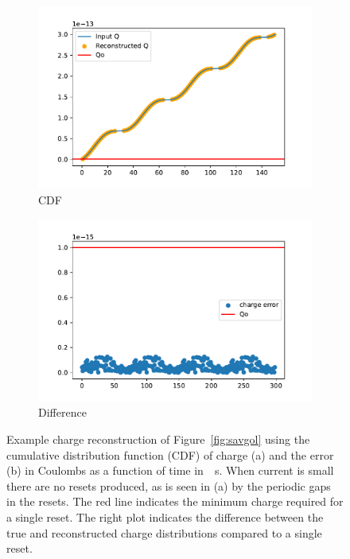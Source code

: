 \begin{figure}[]
\centering
\begin{subfigure}{.5\textwidth}
  \centering
  \includegraphics[width=\textwidth]{images/reconQ.pdf}
  \caption{CDF}
\end{subfigure}%
\begin{subfigure}{.5\textwidth}
  \centering
  \includegraphics[width=\textwidth]{images/diffQ.pdf}
  \caption{Difference}
\end{subfigure}
\caption{Example charge reconstruction of Figure~\ref{fig:savgol} using the cumulative distribution function (CDF) of charge (a) and the error (b) in Coulombs as a function of time in~\unit{\mu s}.
When current is small there are no resets produced, as is seen in (a) by the periodic gaps in the resets.
The red line indicates the minimum charge required for a single reset.
The right plot indicates the difference between the true and reconstructed charge distributions compared to a single reset.
}
\label{fig:reconQ}
\end{figure}

